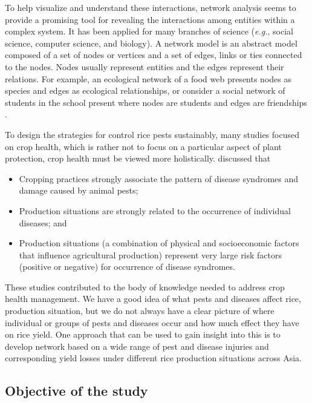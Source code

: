 To help visualize and understand these interactions, network analysis seems to provide a promising tool for revealing the interactions among entities within a complex system. It has been applied for many branches of science (\textit{e.g.}, social science, computer science, and biology). A network model is an abstract model composed of a set of nodes or vertices and a set of edges, links or ties connected to the nodes. Nodes usually represent entities and the edges represent their relations. For example, an ecological network of a food web presents nodes as species \citep{krause2003compartments} and edges as ecological relationships, or consider a social network of students in the school present where nodes are students and edges are friendships \citep{moody2001race}.

To design the strategies for control rice pests sustainably, many studies focused on crop health, which is rather not to focus on a particular aspect of plant protection, crop health must be viewed more holistically. \cite{savary1995use,Savary:2000vr,savary2005multiple} discussed that

\begin{itemize}
\item Cropping practices strongly associate the pattern of disease syndromes and damage caused by animal pests;
\item Production situations are strongly related to the occurrence of  individual diseases; and
\item Production situations (a combination of physical and socioeconomic factors that influence agricultural production) represent very large risk factors (positive or negative) for occurrence of disease syndromes. 
\end{itemize}
 
These studies contributed to the body of knowledge needed to address crop health management. We have a good idea of what pests and diseases affect rice, production situation, but we do not always have a clear picture of where individual or groups of pests and diseases occur and how much effect they have on rice yield. One approach that can be used to gain insight into this is to develop network based on a wide range of pest and disease injuries and corresponding yield losses under different rice production situations across Asia. 

\subsection{Objective of the study}

